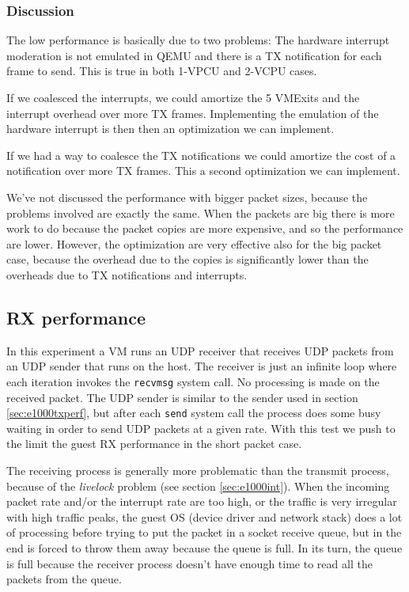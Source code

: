 \subsubsection{Discussion}
\label{sec:e1000txperfdiscuss}
The low performance is basically due to two problems: The hardware interrupt moderation is not emulated in QEMU and there is a TX 
notification for each frame to send. This is true in both 1-VPCU and 2-VCPU cases.

If we coalesced the interrupts, we could amortize the 5 VMExits and the interrupt overhead over more TX frames.
Implementing the emulation of the hardware interrupt is then then an optimization we can implement.

If we had a way to coalesce the TX notifications we could amortize the cost of a notification over more TX frames. This
a second optimization we can implement.

\vspace{0.5cm}

We've not discussed the performance with bigger packet sizes, because the problems involved are exactly the same. When the packets are 
big there is more work to do because the packet copies are more expensive, and so the performance are lower. However,
the optimization are very effective also for the big packet case, because the overhead due to the copies is significantly lower than
the overheads due to TX notifications and interrupts.



\subsection{RX performance}
In this experiment a VM runs an UDP receiver that receives UDP packets from an UDP sender that runs on the host. The receiver is just an 
infinite loop where each iteration invokes the \texttt{recvmsg} system call. No processing is made on the received packet.
The UDP sender is similar to the sender used in section \ref{sec:e1000txperf}, but after each \texttt{send} system call the process
does some busy waiting in order to send UDP packets at a given rate.
With this test we push to the limit the guest RX performance in the short packet case.

\vspace{0.5cm}

The receiving process is generally more problematic than the transmit process, because of the \emph{livelock} problem (see section 
\ref{sec:e1000int}).
When the incoming packet rate and/or the interrupt rate are too high, or the traffic is very irregular with high traffic peaks, the guest
OS (device driver and network stack) does a lot of processing before trying to put the packet in a socket receive queue, but in the end
is forced to throw them away because the queue is full. In its turn, the queue is full because the receiver process doesn't have enough
time to read all the packets from the queue.

